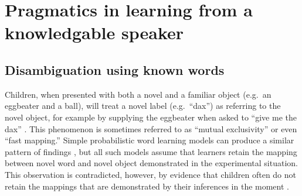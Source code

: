 \documentclass{article} %
\begin{document}

\section{Pragmatics in learning from a knowledgable speaker}

\subsection{Disambiguation using known words}


Children, when presented with both a novel and a familiar object
(e.g.~an eggbeater and a ball), will treat a novel label
(e.g.~``dax'') as referring to the novel object, for example by
supplying the eggbeater when asked to ``give me the dax''
\cite{markman1988}. This phenomenon is sometimes referred to as
``mutual exclusivity'' or even ``fast mapping.'' Simple probabilistic word learning models can produce a
similar pattern of findings \cite{frank2009}, but all such models assume that learners retain the
mapping between novel word and novel object demonstrated in the
experimental situation. This observation is contradicted, however, by
evidence that children often do not retain the mappings that are
demonstrated by their inferences in the moment \cite{horst2008}.
\end{document}
